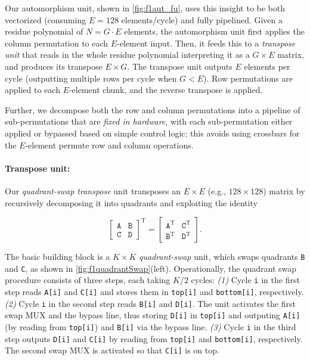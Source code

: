 \figFOneautfu
Our automorphism unit, shown in \autoref{fig:f1aut_fu},
uses this insight to be both vectorized (consuming $E=128$ elements/cycle) and fully pipelined.
Given a residue polynomial of $N=G\cdot E$ elements, the automorphism unit first applies the column permutation
to each $E$-element input.
Then, it feeds this to a \emph{transpose unit} that reads in the whole residue polynomial interpreting it as a $G\times E$ matrix,
and produces its transpose $E\times G$.
The transpose unit outputs $E$ elements per cycle (outputting multiple rows per cycle when $G < E$).
Row permutations are applied to each $E$-element chunk, and the reverse transpose is applied.


Further, we decompose both the row and column permutations into a pipeline of sub-permutations that are \textit{fixed in hardware},
with each sub-permutation either applied or bypassed based on simple control logic; this avoids using crossbars for the $E$-element permute row and column operations.

\figFOneQuadrantSwap

\paragraph{Transpose unit:}
Our \textit{quadrant-swap transpose} unit transposes an $E \times E$ (e.g., $128\times 128$) matrix by recursively decomposing it into quadrants and exploiting
the identity

\begin{equation*}
  \left[ \begin{array}{c|c}
      \texttt{A} & \texttt{B}\\
      \hline
      \texttt{C} & \texttt{D}
  \end{array}\right]^{\textrm{T}} =   \left[ \begin{array}{c|c}
      \texttt{A}^{\textrm{T}} & \texttt{C}^{\textrm{T}} \\
      \hline
      \texttt{B}^{\textrm{T}} & \texttt{D}^{\textrm{T}}
  \end{array}\right].
\end{equation*}

The basic building block is a $K \times K$ \textit{quadrant-swap} unit, which swaps quadrants \texttt{B} and \texttt{C}, as shown in \autoref{fig:f1quadrantSwap}(left). Operationally, the quadrant swap procedure consists of three steps, each taking $K/2$ cycles:
  \emph{(1)} Cycle \texttt{i} in the first step reads \texttt{A[i]} and \texttt{C[i]} and stores them in \texttt{top[i]} and \texttt{bottom[i]}, respectively.
\emph{(2)} Cycle \texttt{i} in the second step reads \texttt{B[i]} and \texttt{D[i]}. The unit activates the first swap MUX and the bypass line, thus storing \texttt{D[i]} in \texttt{top[i]} and outputing \texttt{A[i]} (by reading from \texttt{top[i]}) and \texttt{B[i]} via the bypass line.
\emph{(3)} Cycle \texttt{i} in the third step outputs \texttt{D[i]} and \texttt{C[i]} by reading from \texttt{top[i]} and \texttt{bottom[i]}, respectively. The second swap MUX is activated so that \texttt{C[i]} is on top.

